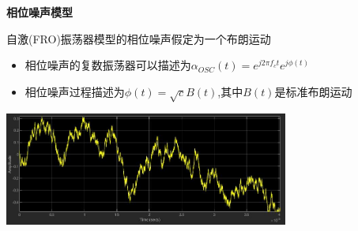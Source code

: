 	\begin{frame}{\textbf{相位噪声模型}}
		\begin{block}{自激(FRO)振荡器模型的相位噪声假定为一个布朗运动}
			\begin{itemize}
				\item 相位噪声的复数振荡器可以描述为$\alpha_{OSC}(t) = e^{j2\pi f_ct}e^{j\phi(t)}$
				\item 相位噪声过程描述为$\phi(t) = \sqrt{c}B(t)$,其中$B(t)$是标准布朗运动
			\end{itemize}
		\end{block}
		\centering
		\includegraphics[width = 0.7\textwidth]{images/Ref2Fig2.jpg}
    \end{frame}

